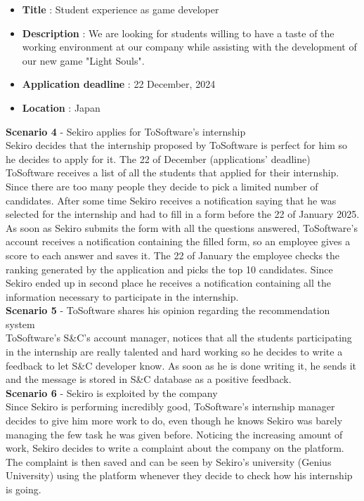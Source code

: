 \documentclass[11pt,twoside]{article}
\begin{document}
\begin{itemize}
\item[] \textbf{Title} : Student experience as game developer
\item[] \textbf{Description} : We are looking for students willing to have a taste of the working environment at our company while assisting with the development of our new game "Light Souls".
\item[] \textbf{Application deadline} : 22 December, 2024
\item[] \textbf{Location} : Japan
\end{itemize}
\vspace{1\baselineskip}
\textbf{\large{Scenario 4}} - Sekiro applies for ToSoftware's internship \\
Sekiro decides that the internship proposed by ToSoftware is perfect for him so he decides to apply for it. The 22 of December (applications' deadline) ToSoftware receives a list of all the students that applied for their internship. Since there are too many people they decide to pick a limited number of candidates. After some time Sekiro receives a notification saying that he was selected for the internship and had to fill in a form before the 22 of January 2025. As soon as Sekiro submits the form with all the questions answered, ToSoftware's account receives a notification containing the filled form, so an employee gives a score to each answer and saves it. The 22 of January the employee checks the ranking generated by the application and picks the top 10 candidates. Since Sekiro ended up in second place he receives a notification containing all the information necessary to participate in the internship.
\vspace{1\baselineskip} \\
\textbf{\large{Scenario 5}} - ToSoftware shares his opinion regarding the recommendation system \\
ToSoftware's S\&C's account manager, notices that all the students participating in the internship are really talented and hard working so he decides to write a feedback to let S\&C developer know. As soon as he is done writing it, he sends it and the message is stored in S\&C database as a positive feedback.
\vspace{1\baselineskip} \\
\textbf{\large{Scenario 6}} - Sekiro is exploited by the company \\
Since Sekiro is performing incredibly good, ToSoftware's internship manager decides to give him more work to do, even though he knows Sekiro was barely managing the few task he was given before. Noticing the increasing amount of work, Sekiro decides to write a complaint about the company on the platform. The complaint is then saved and can be seen by Sekiro's university (Genius University) using the platform whenever they decide to check how his internship is going.
\end{document}
